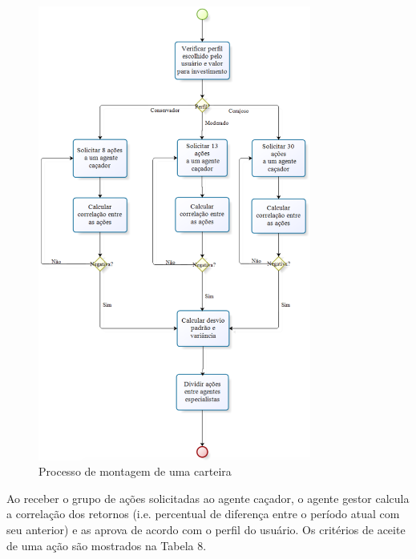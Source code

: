 \begin{description}
\begin{itemize}
\begin{figure}[H]
\centering
\label{f23}
\includegraphics[width=0.8\textwidth]{figuras/f14}
\caption{Processo de montagem de uma carteira}

\end{figure}
\FloatBarrier

Ao receber o grupo de ações solicitadas ao agente caçador, o agente gestor calcula a correlação dos retornos (i.e. percentual de diferença entre o período atual com seu anterior) e as aprova de acordo com o perfil do usuário. Os critérios de aceite de uma ação são mostrados na Tabela 8.


\end{itemize}
\end{description}
